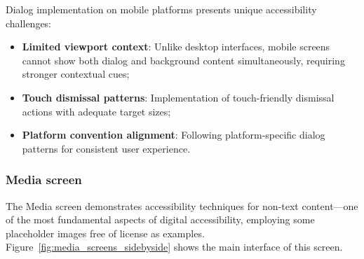 Dialog implementation on mobile platforms presents unique accessibility challenges:

\begin{itemize}
    \item \textbf{Limited viewport context}: Unlike desktop interfaces, mobile screens cannot show both dialog and background content simultaneously, requiring stronger contextual cues;
    
    \item \textbf{Touch dismissal patterns}: Implementation of touch-friendly dismissal actions with adequate target sizes;
    
    \item \textbf{Platform convention alignment}: Following platform-specific dialog patterns for consistent user experience.
\end{itemize}

\subsubsection{Media screen}
\label{subsubsec:media-screen}

The Media screen demonstrates accessibility techniques for non-text content—one of the most fundamental aspects of digital accessibility, employing some placeholder images free of license as examples.
Figure~\ref{fig:media_screens_sidebyside} shows the main interface of this screen.

